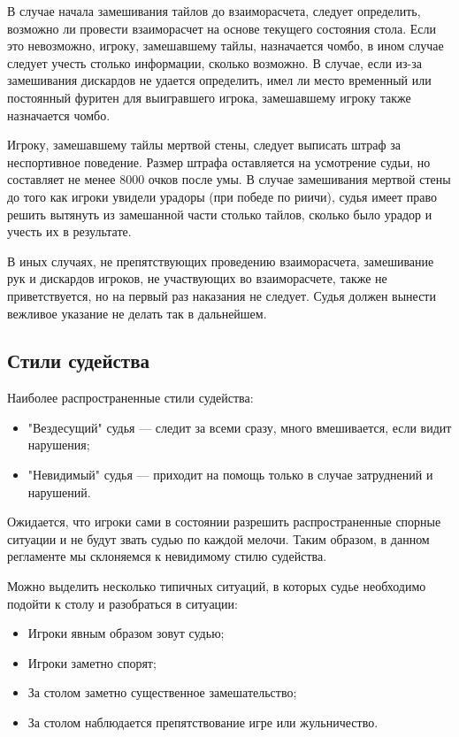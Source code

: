 В случае начала замешивания тайлов до взаиморасчета, следует определить, возможно ли провести взаиморасчет на основе текущего состояния стола. Если это невозможно, игроку, замешавшему тайлы, назначается чомбо, в ином случае следует учесть столько информации, сколько возможно. В случае, если из-за замешивания дискардов не удается определить, имел ли место временный или постоянный фуритен для выигравшего игрока, замешавшему игроку также назначается чомбо.

Игроку, замешавшему тайлы мертвой стены, следует выписать штраф за неспортивное поведение. Размер штрафа оставляется на усмотрение судьи, но составляет не менее 8000 очков после умы. В случае замешивания мертвой стены до того как игроки увидели урадоры (при победе по риичи), судья имеет право решить вытянуть из замешанной части столько тайлов, сколько было урадор и учесть их в результате. 

В иных случаях, не препятствующих проведению взаиморасчета, замешивание рук и дискардов игроков, не участвующих во взаиморасчете, также не приветствуется, но на первый раз наказания не следует. Судья должен вынести вежливое указание не делать так в дальнейшем.

\subsection{Стили судейства}

Наиболее распространенные стили судейства:
\begin{itemize}
	\item "Вездесущий" судья --- следит за всеми сразу, много вмешивается, если видит нарушения;
	\item "Невидимый" судья --- приходит на помощь только в случае затруднений и нарушений.
\end{itemize}

Ожидается, что игроки сами в состоянии разрешить распространенные спорные ситуации и не будут звать судью по каждой мелочи. Таким образом, в данном регламенте мы склоняемся к невидимому стилю судейства.

Можно выделить несколько типичных ситуаций, в которых судье необходимо подойти к столу и разобраться в ситуации:
\begin{itemize}
	\item Игроки явным образом зовут судью;
	\item Игроки заметно спорят;
	\item За столом заметно существенное замешательство;
	\item За столом наблюдается препятствование игре или жульничество.
\end{itemize}

